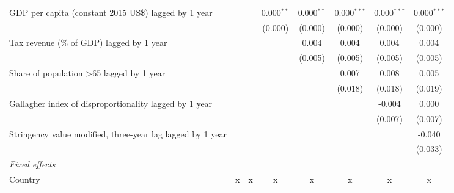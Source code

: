 \begin{tabular}{lccccccc}
   GDP per capita (constant 2015 US\$) lagged by 1 year                                 &         &               & 0.000$^{**}$  & 0.000$^{**}$  & 0.000$^{***}$ & 0.000$^{***}$ & 0.000$^{***}$\\   
                                                                                        &         &               & (0.000)       & (0.000)       & (0.000)       & (0.000)       & (0.000)\\   
   Tax revenue (\% of GDP) lagged by 1 year                                             &         &               &               & 0.004         & 0.004         & 0.004         & 0.004\\   
                                                                                        &         &               &               & (0.005)       & (0.005)       & (0.005)       & (0.005)\\   
   Share of population >65 lagged by 1 year                                             &         &               &               &               & 0.007         & 0.008         & 0.005\\   
                                                                                        &         &               &               &               & (0.018)       & (0.018)       & (0.019)\\   
   Gallagher index of disproportionality lagged by 1 year                               &         &               &               &               &               & -0.004        & 0.000\\   
                                                                                        &         &               &               &               &               & (0.007)       & (0.007)\\   
   Stringency value modified, three-year lag lagged by 1 year                           &         &               &               &               &               &               & -0.040\\   
                                                                                        &         &               &               &               &               &               & (0.033)\\   
   \emph{Fixed effects}\\
   Country                                                                              & x       & x             & x             & x             & x             & x             & x\\  

\end{tabular}
